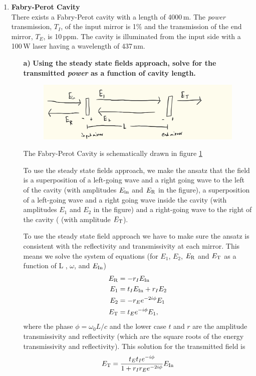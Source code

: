 \documentclass[11pt]{article}
\begin{document}
%



\medskip

\begin{enumerate}

\item
{\bf Fabry-Perot Cavity} \\
There exists a Fabry-Perot cavity with a length of 4000\,m. The \emph{power} transmission, $T_I$, of the input mirror is 1\% and the transmission of the end mirror, $T_E$, is 10\,ppm. The cavity is illuminated from the input side with a 100\,W laser having a wavelength of 437\,nm.
\begin{itemize}

\item[\bf a)] {\bf Using the steady state fields approach, solve for the transmitted \emph{power} as a function of cavity length.}

\begin{figure}[t]
\includegraphics[width =1\columnwidth]{FPdiag}
\caption{
}
\label{fig:FP}
\end{figure}

The Fabry-Perot Cavity is schematically drawn in figure \ref{fig:FP}

To use the steady state fields approach, we make the ansatz that the field is a superposition of a left-going wave and a right going wave to the left of the cavity (with amplitudes $E_{\rm in}$ and $E_{\rm R}$ in the figure), a superposition of a left-going wave and a right going wave inside the cavity  (with amplitudes $E_{1}$ and $E_{2}$ in the figure) and a right-going wave to the right of the cavity ( (with amplitude $E_{\rm T}$).

To use the steady state field approach we have to make sure the ansatz is consistent with the reflectivity and transmissivity at each mirror. This means we solve the system of equations (for $E_1$, $E_2$, $E_{\rm R}$ and $E_{\rm T}$ as a function of L , $\omega$, and $E_{\rm In}$)
\begin{align}
E_{\rm R}&=-r_I E_{\rm In} \\
E_1&=t_I E_{\rm In}+r_I E_2 \\
E_2& =-r_E e^{-2i\phi}E_1 \\
E_{\rm T}&=t_E e^{-i\phi}E_1,
\end{align}
where the phase $\phi =\omega_0L/c$ and the lower case $t$ and $r$ are the amplitude transmissivity and reflectivity (which are the square roots of the energy transmissivity and reflectivity). 
This solution for the transmitted field is 
\begin{align}
E_{\rm T}=\frac{t_Et_I e^{-i\phi}}{1+r_Ir_E e^{-2i\phi}}E_{\rm In}
\end{align}


\end{itemize}
\end{enumerate}
\end{document}
